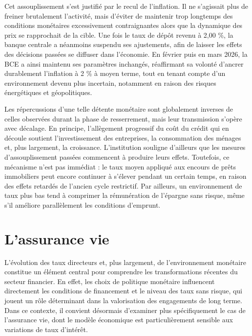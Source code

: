 Cet assouplissement s'est justifié par le recul de l'inflation. Il ne s'agissait plus de freiner brutalement l'activité, mais d'éviter de maintenir trop longtemps des conditions monétaires excessivement contraignantes alors que la dynamique des prix se rapprochait de la cible. Une fois le taux de dépôt revenu à 2,00 \%, la banque centrale a néanmoins suspendu ses ajustements, afin de laisser les effets des décisions passées se diffuser dans l'économie. En février puis en mars 2026, la BCE a ainsi maintenu ses paramètres inchangés, réaffirmant sa volonté d'ancrer durablement l'inflation à 2 \% à moyen terme, tout en tenant compte d'un environnement devenu plus incertain, notamment en raison des risques énergétiques et géopolitiques.

Les répercussions d'une telle détente monétaire sont globalement inverses de celles observées durant la phase de resserrement, mais leur transmission s'opère avec décalage. En principe, l'allègement progressif du coût du crédit qui en découle soutient l'investissement des entreprises, la consommation des ménages et, plus largement, la croissance. L'institution souligne d'ailleurs que les mesures d'assouplissement passées commencent à produire leurs effets. Toutefois, ce mécanisme n'est pas immédiat : le taux moyen appliqué aux encours de prêts immobiliers peut encore continuer à s'élever pendant un certain temps, en raison des effets retardés de l'ancien cycle restrictif. Par ailleurs, un environnement de taux plus bas tend à comprimer la rémunération de l'épargne sans risque, même s'il améliore parallèlement les conditions d'emprunt.




\section{L'assurance vie}


L'évolution des taux directeurs et, plus largement, de l'environnement monétaire constitue un élément central pour comprendre les transformations récentes du secteur financier. En effet, les choix de politique monétaire influencent directement les conditions de financement et le niveau des taux sans risque, qui jouent un rôle déterminant dans la valorisation des engagements de long terme. Dans ce contexte, il convient désormais d'examiner plus spécifiquement le cas de l'assurance vie, dont le modèle économique est particulièrement sensible aux variations de taux d'intérêt.

